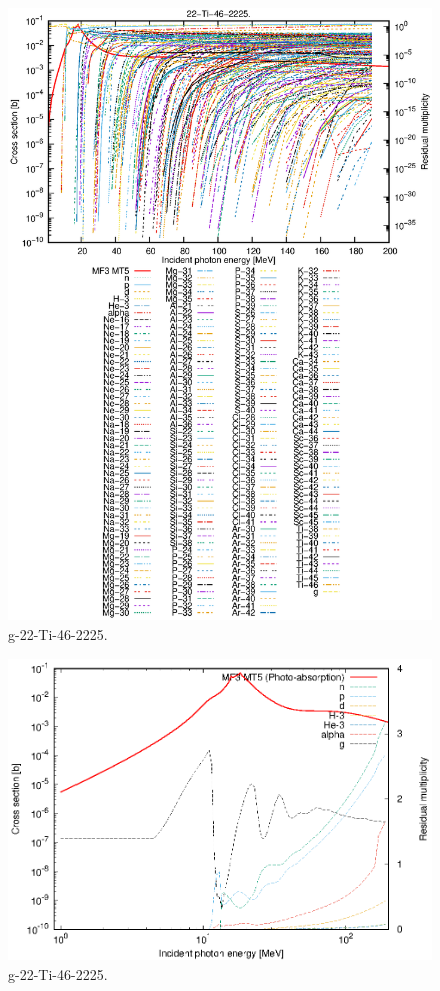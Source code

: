 \begin{figure}
 \includegraphics[width=\linewidth]{eps/g_22-Ti-46_2225.eps}
  \caption{g-22-Ti-46-2225.}
\end{figure}
\newpage \clearpage

\begin{figure}
 \includegraphics[width=\linewidth]{eps-log/g_22-Ti-46_2225.eps}
 \caption{g-22-Ti-46-2225.}
\end{figure}
\newpage \clearpage

